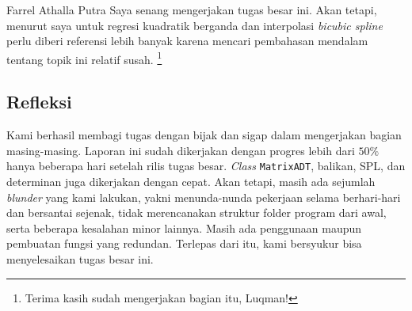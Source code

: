\begin{rmr}{Farrel Athalla Putra}{}
    Saya senang mengerjakan tugas besar ini. Akan tetapi, menurut saya untuk regresi kuadratik berganda dan interpolasi \textit{bicubic spline} perlu diberi referensi lebih banyak karena mencari pembahasan mendalam tentang topik ini relatif susah. \footnote{Terima kasih sudah mengerjakan bagian itu, Luqman!}
\end{rmr}

\subsection{Refleksi}
Kami berhasil membagi tugas dengan bijak dan sigap dalam mengerjakan bagian masing-masing. Laporan ini sudah dikerjakan dengan progres lebih dari $50\%$ hanya beberapa hari setelah rilis tugas besar. \textit{Class} \verb+MatrixADT+, balikan, SPL, dan determinan juga dikerjakan dengan cepat. Akan tetapi, masih ada sejumlah \textit{blunder} yang kami lakukan, yakni menunda-nunda pekerjaan selama berhari-hari dan bersantai sejenak, tidak merencanakan struktur folder program dari awal, serta beberapa kesalahan minor lainnya. Masih ada penggunaan maupun pembuatan fungsi yang redundan. Terlepas dari itu, kami bersyukur bisa menyelesaikan tugas besar ini.

\pagebreak